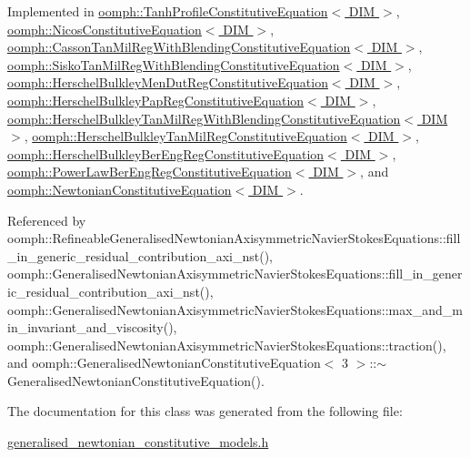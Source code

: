 Implemented in \hyperlink{classoomph_1_1TanhProfileConstitutiveEquation_aee5659a24ab4d18f4a90661113528ca3}{oomph\+::\+Tanh\+Profile\+Constitutive\+Equation$<$ D\+I\+M $>$}, \hyperlink{classoomph_1_1NicosConstitutiveEquation_a69afbe7d614474de9441a4ad3805ea05}{oomph\+::\+Nicos\+Constitutive\+Equation$<$ D\+I\+M $>$}, \hyperlink{classoomph_1_1CassonTanMilRegWithBlendingConstitutiveEquation_a6794675f3a7e2def339b01a5f9a71447}{oomph\+::\+Casson\+Tan\+Mil\+Reg\+With\+Blending\+Constitutive\+Equation$<$ D\+I\+M $>$}, \hyperlink{classoomph_1_1SiskoTanMilRegWithBlendingConstitutiveEquation_aab87a911e6c87d5126240a756ea1a5fe}{oomph\+::\+Sisko\+Tan\+Mil\+Reg\+With\+Blending\+Constitutive\+Equation$<$ D\+I\+M $>$}, \hyperlink{classoomph_1_1HerschelBulkleyMenDutRegConstitutiveEquation_acd2e8cb9f733c39736294631dabe61dd}{oomph\+::\+Herschel\+Bulkley\+Men\+Dut\+Reg\+Constitutive\+Equation$<$ D\+I\+M $>$}, \hyperlink{classoomph_1_1HerschelBulkleyPapRegConstitutiveEquation_a53c9a6dc6aea602726bd58e6f0875704}{oomph\+::\+Herschel\+Bulkley\+Pap\+Reg\+Constitutive\+Equation$<$ D\+I\+M $>$}, \hyperlink{classoomph_1_1HerschelBulkleyTanMilRegWithBlendingConstitutiveEquation_acd0153be4f3e8177b21c5fe0f9a31b11}{oomph\+::\+Herschel\+Bulkley\+Tan\+Mil\+Reg\+With\+Blending\+Constitutive\+Equation$<$ D\+I\+M $>$}, \hyperlink{classoomph_1_1HerschelBulkleyTanMilRegConstitutiveEquation_af34701ebef214fb30dbc2813e66173b5}{oomph\+::\+Herschel\+Bulkley\+Tan\+Mil\+Reg\+Constitutive\+Equation$<$ D\+I\+M $>$}, \hyperlink{classoomph_1_1HerschelBulkleyBerEngRegConstitutiveEquation_aa56ae7a2ef80789048d81925d9c9e9db}{oomph\+::\+Herschel\+Bulkley\+Ber\+Eng\+Reg\+Constitutive\+Equation$<$ D\+I\+M $>$}, \hyperlink{classoomph_1_1PowerLawBerEngRegConstitutiveEquation_a9f98f9120f7fe2aa6813098a946459de}{oomph\+::\+Power\+Law\+Ber\+Eng\+Reg\+Constitutive\+Equation$<$ D\+I\+M $>$}, and \hyperlink{classoomph_1_1NewtonianConstitutiveEquation_a28c8373040e25ce4027be08dd49aa444}{oomph\+::\+Newtonian\+Constitutive\+Equation$<$ D\+I\+M $>$}.



Referenced by oomph\+::\+Refineable\+Generalised\+Newtonian\+Axisymmetric\+Navier\+Stokes\+Equations\+::fill\+\_\+in\+\_\+generic\+\_\+residual\+\_\+contribution\+\_\+axi\+\_\+nst(), oomph\+::\+Generalised\+Newtonian\+Axisymmetric\+Navier\+Stokes\+Equations\+::fill\+\_\+in\+\_\+generic\+\_\+residual\+\_\+contribution\+\_\+axi\+\_\+nst(), oomph\+::\+Generalised\+Newtonian\+Axisymmetric\+Navier\+Stokes\+Equations\+::max\+\_\+and\+\_\+min\+\_\+invariant\+\_\+and\+\_\+viscosity(), oomph\+::\+Generalised\+Newtonian\+Axisymmetric\+Navier\+Stokes\+Equations\+::traction(), and oomph\+::\+Generalised\+Newtonian\+Constitutive\+Equation$<$ 3 $>$\+::$\sim$\+Generalised\+Newtonian\+Constitutive\+Equation().



The documentation for this class was generated from the following file\+:\begin{DoxyCompactItemize}
\item 
\hyperlink{generalised__newtonian__constitutive__models_8h}{generalised\+\_\+newtonian\+\_\+constitutive\+\_\+models.\+h}\end{DoxyCompactItemize}
